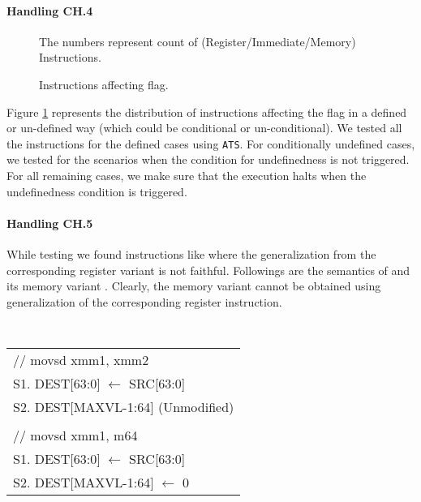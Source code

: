     
   \paragraph{Handling CH.4}
   \begin{figure}[t]
       \centering
       \caption{Instructions affecting  flag.} The numbers represent count of (Register/Immediate/Memory) Instructions. 
       \label{fig:AD}
   \end{figure}

   Figure \ref{fig:AD} represents the distribution of instructions affecting the
    flag in a defined or un-defined way (which could be conditional or
       un-conditional).  We tested all the instructions for the defined cases
   using {\tt ATS}. For conditionally undefined cases, we tested for the
   scenarios when the condition for undefinedness is not triggered.  For all
   remaining cases,  we make sure that the \K execution halts when the
   undefinedness condition is triggered.        
   
   \paragraph{Handling CH.5}
   
   While testing we found instructions like 
   where the generalization from the corresponding register variant is not
   faithful. Followings are the semantics of  and its
   memory variant  . Clearly, the memory variant cannot
   be obtained using generalization of the  corresponding register instruction.   
   
   {\small \tt 
       \centering
       \begin{tabular}[b]{l}
           // movsd xmm1, xmm2 \\
           S1. DEST[63:0] $\leftarrow$ SRC[63:0] \\ 
           S2. DEST[MAXVL-1:64] (Unmodified) \\
           \\
           // movsd xmm1, m64 \\
           S1. DEST[63:0] $\leftarrow$ SRC[63:0] \\
           S2. DEST[MAXVL-1:64] $\leftarrow$ 0 \\
       \end{tabular}
   }





